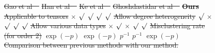 \documentclass[twoside]{article}
\theoremstyle{definition}
\theoremstyle{definition}
\providecommand{\DIFdeltex}[1]{{\protect\color{red}\sout{#1}}}                      %
\providecommand{\DIFdelbegin}{} %
\providecommand{\DIFdelFL}[1]{\DIFdel{#1}} %
\providecommand{\DIFaddbeginFL}{} %
\providecommand{\DIFaddendFL}{} %
\providecommand{\DIFdelbeginFL}{} %
\providecommand{\DIFdelendFL}{} %
\providecommand{\DIFdel}[1]{\texorpdfstring{\DIFdeltex{#1}}{}} %
\newcommand{\DIFscaledelfig}{0.5}
\newlength{\DIFdelgraphicswidth} %
\newlength{\DIFdelgraphicsheight} %
\newcommand{\DIFaddincludegraphics}[2][]{{\color{blue}\fbox{\DIFOincludegraphics[#1]{#2}}}} %
\newcommand{\DIFdelincludegraphics}[2][]{%
\sbox{\DIFdelgraphicsbox}{\DIFOincludegraphics[#1]{#2}}%
\settoboxwidth{\DIFdelgraphicswidth}{\DIFdelgraphicsbox} %
\settoboxtotalheight{\DIFdelgraphicsheight}{\DIFdelgraphicsbox} %
\scalebox{\DIFscaledelfig}{%
\parbox[b]{\DIFdelgraphicswidth}{\usebox{\DIFdelgraphicsbox}\\[-\baselineskip] \rule{\DIFdelgraphicswidth}{0em}}\llap{\resizebox{\DIFdelgraphicswidth}{\DIFdelgraphicsheight}{%
\setlength{\unitlength}{\DIFdelgraphicswidth}%
\begin{picture}(1,1)%
\thicklines\linethickness{2pt} %
{\color[rgb]{1,0,0}\put(0,0){\framebox(1,1){}}}%
{\color[rgb]{1,0,0}\put(0,0){\line( 1,1){1}}}%
{\color[rgb]{1,0,0}\put(0,1){\line(1,-1){1}}}%
\end{picture}%
}\hspace*{3pt}}} %
} %
\DeclareRobustCommand{\DIFdelbegin}{\DIFOdelbegin \let\includegraphics\DIFdelincludegraphics} %
\DeclareRobustCommand{\DIFaddbeginFL}{\DIFOaddbeginFL \let\includegraphics\DIFaddincludegraphics} %
\DeclareRobustCommand{\DIFaddendFL}{\DIFOaddendFL \let\includegraphics\DIFOincludegraphics} %
\DeclareRobustCommand{\DIFdelbeginFL}{\DIFOdelbeginFL \let\includegraphics\DIFdelincludegraphics} %
\DeclareRobustCommand{\DIFdelendFL}{\DIFOaddendFL \let\includegraphics\DIFOincludegraphics} %
\begin{document}
\DIFdelbegin %
\DIFdelendFL \DIFaddbeginFL \begin{figure}[t]
    \DIFaddendFL \centering
    \DIFdelbeginFL %
\DIFdelFL{Gao et al~\mbox{%
\cite{gao2018community}}\hspace{0pt}%
}%
\DIFdelFL{Han et al~\mbox{%
\cite{han2020exact}}\hspace{0pt}%
}%
\DIFdelFL{Ke et al~\mbox{%
\cite{ke2019community}}\hspace{0pt}%
}%
\DIFdelFL{Ghoshdastidar et al~\mbox{%
\cite{ghoshdastidar2017consistency}}\hspace{0pt}%
}%
\textbf{\DIFdelFL{Ours}}%
\DIFdelFL{Applicable to tensors}%
\DIFdelFL{$\times$ }%
\DIFdelFL{$\surd$ }%
\DIFdelFL{$\surd$ }%
\DIFdelFL{$\surd$ }%
\DIFdelFL{$\surd$  }%
\DIFdelFL{Allow degree heterogeneity}%
\DIFdelFL{$\surd$ }%
\DIFdelFL{$\times$ }%
\DIFdelFL{$\surd$ }%
\DIFdelFL{$\surd$ }%
\DIFdelFL{$\surd$ }%
\DIFdelFL{Allow various data types}%
\DIFdelFL{$\times$ }%
\DIFdelFL{$\surd$ }%
\DIFdelFL{$\times$ }%
\DIFdelFL{$\surd$  }%
\DIFdelFL{$\surd$}%
\DIFdelFL{Misclustering rate (for order 2)}%
\DIFdelFL{$\exp(-p)$ }%
\DIFdelFL{$\exp(-p)$ }%
\DIFdelFL{$p^{-1}$ }%
\DIFdelFL{$p^{-1}$}%
\DIFdelFL{$\exp(-p)$}%
{%
\DIFdelFL{Comparison between previous methods with our method. }}%


\end{figure}
\end{document}
